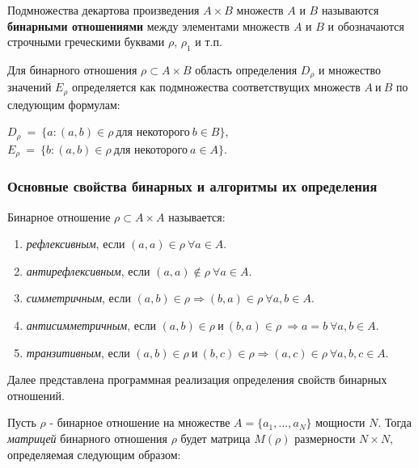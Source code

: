 \documentclass[bachelor, och, labwork]{shiza}
\begin{document}
Подмножества декартова произведения $A \times B$ множеств $A$ и $B$ называются
\textbf{бинарными отношениями} между элементами множеств $A$ и $B$ и 
обозначаются строчными греческими буквами $\rho$, $\rho_1$ и т.п.

Для бинарного отношения $\rho\subset A \times B$ область определения $D_\rho$ и 
множество значений $E_\rho$ определяется как подмножества соответствущих множеств 
$A ~\text{и}~ B$ по следующим формулам:

\begin{center}
    $D_\rho ~ = ~ \{a : (a, b) \in\rho ~ \text{для некоторого} ~ b \in B\}$,
    $E_\rho ~ = ~ \{b : (a, b) \in\rho ~ \text{для некоторого} ~ a \in A\}$.
\end{center}

\subsubsection{Основные свойства бинарных и алгоритмы их определения}

Бинарное отношение $\rho \subset A \times A$ называется:

\begin{enumerate}
    
    \item \textit{рефлексивным}, если $(a,a)\in\rho~\forall a \in A$.
    
    \item \textit{антирефлексивным}, если $(a,a)\not\in\rho~\forall a \in A$.
    
    \item \textit{симметричным}, если $(a,b)\in\rho\Rightarrow (b,a)\in\rho~\forall a,b\in A$.
    
    \item \textit{антисимметричным}, если $(a,b) \in\rho~\text{и}~(b,a) \in\rho ~ \Rightarrow a = b ~\forall a,b \in A$.
    
    \item \textit{транзитивным}, если $(a,b)\in\rho ~\text{и}~ (b,c)\in\rho\Rightarrow (a,c) \in\rho ~\forall a,b,c \in A$.

\end{enumerate}

Далее представлена программная реализация определения свойств бинарных 
отношений.

Пусть $\rho$ - бинарное отношение на множестве $A=\{a_1,...,a_N\}$ мощности $N$.
Тогда \textit{матрицей} бинарного отношения $\rho$ будет матрица $M(\rho)$ 
размерности $N \times N$, определяемая следующим образом: 
\end{document}
